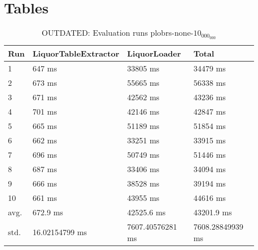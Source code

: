 \section{Tables}
\label{appendix:example1}
\begin{table}[ht]
	\caption{OUTDATED: Evaluation runs plobrs-none-$10_000_000$}
	\label{outdated:tab:eval:plobrs-none-10_000_000}
	\begin{tabular}{|l|l|l|l|}
		\hline
		Run  & LiquorTableExtractor & LiquorLoader     & Total            \\
		\hline
		1    & 647 ms               & 33805 ms         & 34479 ms         \\
		2    & 673 ms               & 55665 ms         & 56338 ms         \\
		3    & 671 ms               & 42562 ms         & 43236 ms         \\
		4    & 701 ms               & 42146 ms         & 42847 ms         \\
		5    & 665 ms               & 51189 ms         & 51854 ms         \\
		6    & 662 ms               & 33251 ms         & 33915 ms         \\
		7    & 696 ms               & 50749 ms         & 51446 ms         \\
		8    & 687 ms               & 33406 ms         & 34094 ms         \\
		9    & 666 ms               & 38528 ms         & 39194 ms         \\
		10   & 661 ms               & 43955 ms         & 44616 ms         \\
		\hline
		avg. & 672.9 ms             & 42525.6 ms       & 43201.9 ms       \\
		std. & 16.02154799 ms       & 7607.40576281 ms & 7608.28849939 ms \\
		\hline
	\end{tabular}
\end{table}
